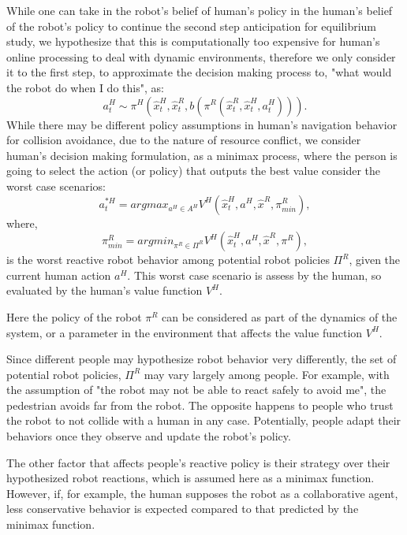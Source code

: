 \documentclass{article}
\begin{document}
While one can take in the robot's belief of human's policy in the human's 
belief of the robot's policy to continue the second step anticipation for 
equilibrium study, we hypothesize that this is computationally too expensive 
for human's online processing to deal with dynamic environments, therefore we 
only consider it to the first step, to approximate the decision making process 
to, "what would the robot do when I do this", as:
\begin{equation}
a^H_t \sim \pi^H (\hat{x}^H_t, \hat{x}^R_t, b(\pi^R (\hat{x}^R_t, \hat{x}^H_t,a^H_t ))).
\end{equation}
While there may be different policy assumptions in human's navigation behavior for collision avoidance, due to the nature of resource conflict, we consider human's decision making formulation, as a minimax process, where the person is going to select the action (or policy) that outputs the best value consider the worst case scenarios:
\begin{equation}
a^{*H}_t = argmax_{a^H \in A^H} V^H(\hat{x}^H_t, a^H ,\hat{x}^R,\pi^R_{min}),
\end{equation}
where,
\begin{equation}
    \pi^R_{min} = argmin_{\pi^R \in \Pi^R} V^H(\hat{x}^H_t,a^H, \hat{x}^R, \pi^R),
\end{equation}
is the worst reactive robot behavior among potential robot policies $\Pi^R$, given the current human action $a^H$. This worst case scenario is assess by the human, so evaluated by the human's value function $V^H$. 

Here the policy of the robot $\pi^R$ can be considered as part of the dynamics of the system, or a parameter in the environment that affects the value function $V^H$. 

Since different people may hypothesize robot behavior very differently, the set of potential robot policies, $\Pi^R$ may vary largely among people. For example, with the assumption of "the robot may not be able to react safely to avoid me", the pedestrian avoids far from the robot. The opposite happens to people who trust the robot to not collide with a human in any case. Potentially, people adapt their behaviors once they observe and update the robot's policy. 

The other factor that affects people's reactive policy is their strategy over their hypothesized robot reactions, which is assumed here as a minimax function. However, if, for example, the human supposes the robot as a collaborative agent, less conservative behavior is expected compared to that predicted by the minimax function.
\end{document}
